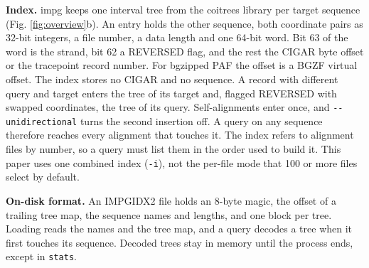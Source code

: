 \textbf{Index.}
impg keeps one interval tree from the coitrees library \citep{Jones2024coitrees} per target sequence (Fig. \ref{fig:overview}b).
An entry holds the other sequence, both coordinate pairs as 32-bit integers, a file number, a data length and one 64-bit word.
Bit 63 of the word is the strand, bit 62 a REVERSED flag, and the rest the CIGAR byte offset or the tracepoint record number.
For bgzipped PAF the offset is a BGZF virtual offset.
The index stores no CIGAR and no sequence.
A record with different query and target enters the tree of its target and, flagged REVERSED with swapped coordinates, the tree of its query.
Self-alignments enter once, and \texttt{-{}-unidirectional} turns the second insertion off.
A query on any sequence therefore reaches every alignment that touches it.
The index refers to alignment files by number, so a query must list them in the order used to build it.
This paper uses one combined index (\texttt{-i}), not the per-file mode that 100 or more files select by default.

\textbf{On-disk format.}
An IMPGIDX2 file holds an 8-byte magic, the offset of a trailing tree map, the sequence names and lengths, and one block per tree.
Loading reads the names and the tree map, and a query decodes a tree when it first touches its sequence.
Decoded trees stay in memory until the process ends, except in \texttt{stats}.

